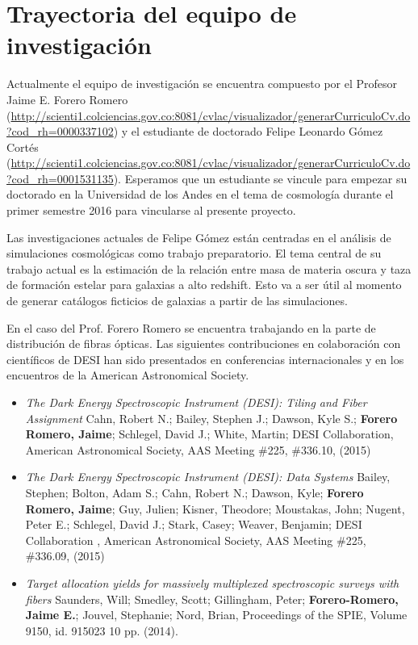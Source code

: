 
\section{Trayectoria del equipo de investigaci\'on}

Actualmente el equipo de investigaci\'on se encuentra compuesto por
el Profesor Jaime E. Forero Romero
(\url{http://scienti1.colciencias.gov.co:8081/cvlac/visualizador/generarCurriculoCv.do?cod_rh=0000337102})
y el estudiante de doctorado Felipe Leonardo G\'omez Cort\'es
(\url{http://scienti1.colciencias.gov.co:8081/cvlac/visualizador/generarCurriculoCv.do?cod_rh=0001531135}). 
Esperamos que un estudiante se vincule para empezar su doctorado en la
Universidad de los Andes en el tema de cosmolog\'ia durante el primer
semestre 2016 para vincularse al presente proyecto.

Las investigaciones actuales de Felipe G\'omez est\'an centradas en el
an\'alisis de simulaciones cosmol\'ogicas como trabajo
preparatorio. El tema central de su trabajo actual es la estimaci\'on
de la relaci\'on entre masa de materia oscura y taza de formaci\'on
estelar para galaxias a alto redshift. Esto va a ser \'util al momento
de generar cat\'alogos ficticios de galaxias a partir de las
simulaciones.  

En el caso del Prof. Forero Romero  se encuentra trabajando en la parte de
distribuci\'on de fibras \'opticas. Las siguientes contribuciones en
colaboraci\'on con cient\'ificos de DESI han sido presentados en
conferencias internacionales y en los encuentros de la  American
Astronomical Society.


\begin{itemize}
\item {\it The Dark Energy Spectroscopic Instrument (DESI): Tiling and
  Fiber Assignment} Cahn, Robert N.; Bailey, Stephen J.; Dawson, Kyle
  S.; {\bf Forero Romero, Jaime}; Schlegel, David J.; White, Martin;
  DESI Collaboration, American Astronomical Society, AAS Meeting \#225,
  \#336.10, (2015)
\item {\it The Dark Energy Spectroscopic Instrument (DESI): Data
  Systems} 	
	Bailey, Stephen; Bolton, Adam S.; Cahn, Robert N.; Dawson,
        Kyle; {\bf Forero Romero, Jaime}; Guy, Julien; Kisner, Theodore;
        Moustakas, John; Nugent, Peter E.; Schlegel, David J.; Stark,
        Casey; Weaver, Benjamin; DESI Collaboration , American
        Astronomical Society, AAS Meeting \#225, \#336.09, (2015)
\item {\it Target allocation yields for massively multiplexed
  spectroscopic surveys with fibers} 	
	Saunders, Will; Smedley, Scott; Gillingham, Peter;
        {\bf Forero-Romero, Jaime E.}; Jouvel, Stephanie; Nord, Brian,
        Proceedings of the SPIE, Volume 9150, id. 915023 10
        pp. (2014). 
\end{itemize}



